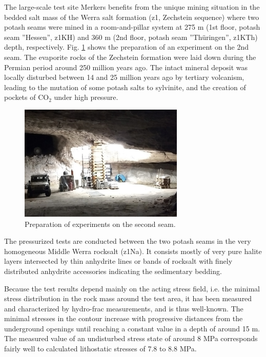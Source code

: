 The large-scale test site Merkers benefits from the unique mining situation in the bedded salt mass of the Werra salt formation (z1, Zechstein sequence) where two potash seams were mined in a room-and-pillar system at 275 m (1st floor, potash seam ''Hessen'', z1KH) and 360 m (2nd floor, potash seam ''Thüringen'', z1KTh) depth, respectively. Fig. \ref{fig:springenlab} shows the preparation of an experiment on the 2nd seam. The evaporite rocks of the Zechstein formation were laid down during the Permian period around 250 million years ago. The intact mineral deposit was locally disturbed between 14 and 25 million years ago by tertiary volcanism, leading to the mutation of some potash salts to sylvinite, and the creation of pockets of CO$_2$ under high pressure.

\begin{figure}
\includegraphics[width=0.7\textwidth]{figures/springen2ndseam.png}
\caption{Preparation of experiments on the second seam.}
\label{fig:springenlab}
\end{figure}

The pressurized tests are conducted between the two potash seams in the very homogeneous Middle Werra rocksalt (z1Na). It consists mostly of very pure halite layers intersected by thin anhydrite lines or bands of rocksalt with finely distributed anhydrite accessories indicating the sedimentary bedding. 

Because the test results depend mainly on the acting stress field, i.e. the minimal stress distribution in the rock mass around the test area, it has been measured and  characterized by hydro-frac measurements, and is thus well-known. The minimal stresses in the contour increase with progressive distances from the underground openings until reaching a constant value in a depth of around 15 m. The measured value of an undisturbed stress state of around 8 MPa corresponds fairly well to calculated lithostatic stresses of 7.8 to 8.8 MPa. 

